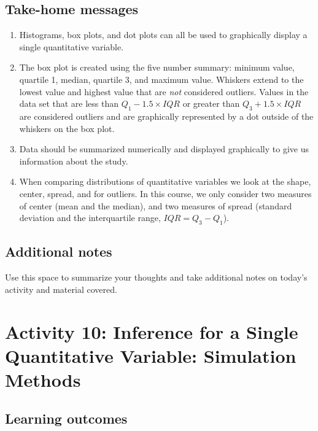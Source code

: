 \documentclass[
]{report}
\begin{document}
\subsection{Take-home messages}\label{take-home-messages-8}

\begin{enumerate}
\def\labelenumi{\arabic{enumi}.}
\item
  Histograms, box plots, and dot plots can all be used to graphically display a single quantitative variable.
\item
  The box plot is created using the five number summary: minimum value, quartile 1, median, quartile 3, and maximum value. Whiskers extend to the lowest value and highest value that are \emph{not} considered outliers. Values in the data set that are less than \(Q_1 - 1.5\times IQR\) or greater than \(Q_3 + 1.5\times IQR\) are considered outliers and are graphically represented by a dot outside of the whiskers on the box plot.
\item
  Data should be summarized numerically and displayed graphically to give us information about the study.
\item
  When comparing distributions of quantitative variables we look at the shape, center, spread, and for outliers. In this course, we only consider two measures of center (mean and the median), and two measures of spread (standard deviation and the interquartile range, \(IQR = Q_3 - Q_1\)).
\end{enumerate}

\subsection{Additional notes}\label{additional-notes-8}

Use this space to summarize your thoughts and take additional notes on today's activity and material covered.

\newpage

\section{Activity 10: Inference for a Single Quantitative Variable: Simulation Methods}\label{activity-10-inference-for-a-single-quantitative-variable-simulation-methods}


\subsection{Learning outcomes}\label{learning-outcomes-10}
\end{document}
